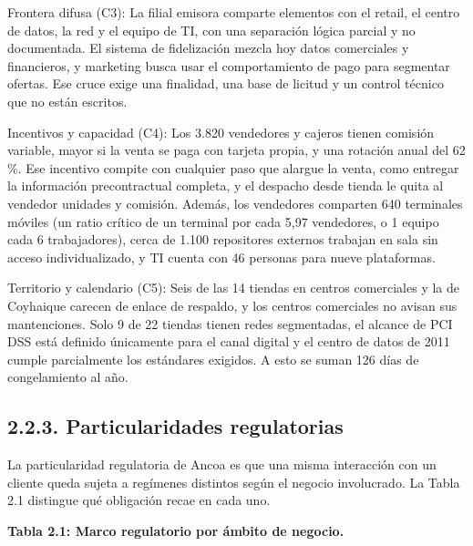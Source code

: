 \documentclass[11pt]{article}
\begin{document}
Frontera difusa (C3): La filial emisora comparte elementos con el retail, el centro de datos, la red y el equipo de TI, con una separación lógica parcial y no documentada. El sistema de fidelización mezcla hoy datos comerciales y financieros, y marketing busca usar el comportamiento de pago para segmentar ofertas. Ese cruce exige una finalidad, una base de licitud y un control técnico que no están escritos.

Incentivos y capacidad (C4): Los 3.820 vendedores y cajeros tienen comisión variable, mayor si la venta se paga con tarjeta propia, y una rotación anual del 62 \%. Ese incentivo compite con cualquier paso que alargue la venta, como entregar la información precontractual completa, y el despacho desde tienda le quita al vendedor unidades y comisión. Además, los vendedores comparten 640 terminales móviles (un ratio crítico de un terminal por cada 5,97 vendedores, o 1 equipo cada 6 trabajadores), cerca de 1.100 repositores externos trabajan en sala sin acceso individualizado, y TI cuenta con 46 personas para nueve plataformas.

Territorio y calendario (C5): Seis de las 14 tiendas en centros comerciales y la de Coyhaique carecen de enlace de respaldo, y los centros comerciales no avisan sus mantenciones. Solo 9 de 22 tiendas tienen redes segmentadas, el alcance de PCI DSS está definido únicamente para el canal digital y el centro de datos de 2011 cumple parcialmente los estándares exigidos. A esto se suman 126 días de congelamiento al año.

\subsection{2.2.3. Particularidades regulatorias}\label{particularidades-regulatorias}

La particularidad regulatoria de Ancoa es que una misma interacción con un cliente queda sujeta a regímenes distintos según el negocio involucrado. La Tabla 2.1 distingue qué obligación recae en cada uno.

\textbf{Tabla 2.1: Marco regulatorio por ámbito de negocio.}
\end{document}
